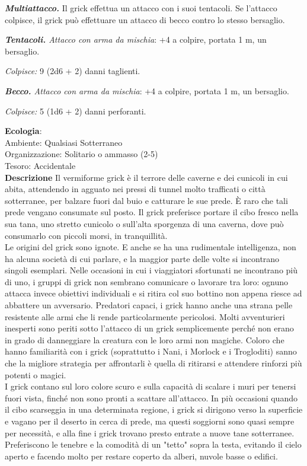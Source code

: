 \begin{multicols}{2}
\emph{\textbf{Multiattacco.}} Il grick effettua un attacco con i suoi tentacoli. Se l'attacco colpisce, il grick può effettuare un attacco di becco contro lo stesso bersaglio.

\emph{\textbf{Tentacoli.} Attacco con arma da mischia}: +4 a colpire, portata 1 m, un bersaglio.

\emph{Colpisce:} 9 (2d6 + 2) danni taglienti.

\emph{\textbf{Becco.} Attacco con arma da mischia}: +4 a colpire,
portata 1 m, un bersaglio.

\emph{Colpisce:} 5 (1d6 + 2) danni perforanti.

\textbf{Ecologia}: \\
Ambiente: Qualsiasi Sotterraneo\\
Organizzazione: Solitario o ammasso (2-5)\\
Tesoro: Accidentale\\

\textbf{Descrizione}
Il vermiforme grick è il terrore delle caverne e dei cunicoli in cui abita, attendendo in agguato nei pressi di tunnel molto trafficati o città sotterranee, per balzare fuori dal buio e catturare le sue prede. È raro che tali prede vengano consumate sul posto. Il grick preferisce portare il cibo fresco nella sua tana, uno stretto cunicolo o sull'alta sporgenza di una caverna, dove può consumarlo con piccoli morsi, in tranquillità.\\
Le origini del grick sono ignote. E anche se ha una rudimentale intelligenza, non ha alcuna società di cui parlare, e la maggior parte delle volte si incontrano singoli esemplari. Nelle occasioni in cui i viaggiatori sfortunati ne incontrano più di uno, i gruppi di grick non sembrano comunicare o lavorare tra loro: ognuno attacca invece obiettivi individuali e si ritira col suo bottino non appena riesce ad abbattere un avversario. Predatori capaci, i grick hanno anche una strana pelle resistente alle armi che li rende particolarmente pericolosi. Molti avventurieri inesperti sono periti sotto l'attacco di un grick semplicemente perché non erano in grado di danneggiare la creatura con le loro armi non magiche. Coloro che hanno familiarità con i grick (soprattutto i Nani, i Morlock e i Trogloditi) sanno che la migliore strategia per affrontarli è quella di ritirarsi e attendere rinforzi più potenti o magici.\\
I grick contano sul loro colore scuro e sulla capacità di scalare i muri per tenersi fuori vista, finché non sono pronti a scattare all'attacco. In più occasioni quando il cibo scarseggia in una determinata regione, i grick si dirigono verso la superficie e vagano per il deserto in cerca di prede, ma questi soggiorni sono quasi sempre per necessità, e alla fine i grick trovano presto entrate a nuove tane sotterranee. Preferiscono le tenebre e la comodità di un "tetto" sopra la testa, evitando il cielo aperto e facendo molto per restare coperto da alberi, nuvole basse o edifici.\\




\end{multicols}
